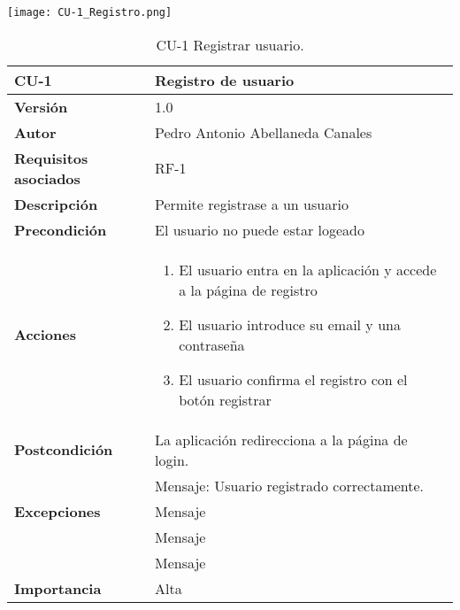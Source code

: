 \begin{table}[p]
	\centering
    \texttt{[image: CU-1\_Registro.png]}
	\begin{tabularx}{\linewidth}{ p{} p{} }
		\toprule
		\textbf{CU-1}    & \textbf{Registro de usuario}\\
		\toprule
		\textbf{Versión}              & 1.0    \\
		\textbf{Autor}                & Pedro Antonio Abellaneda Canales \\
		\textbf{Requisitos asociados} & RF-1 \\
		\textbf{Descripción}          & Permite registrase a un usuario \\
		\textbf{Precondición}         & El usuario no puede estar logeado \\
		\textbf{Acciones}             &
		\begin{enumerate}
			\def\labelenumi{\arabic{enumi}.}
			\tightlist
			\item El usuario entra en la aplicación y accede a la página de registro
			\item El usuario introduce su email y una contraseña
            \item El usuario confirma el registro con el botón registrar
		\end{enumerate}\\
		\textbf{Postcondición}        & La aplicación redirecciona a la página de login. \\ 
                                      & Mensaje: Usuario registrado correctamente. \\
		\textbf{Excepciones}          & Mensaje \\
                                      & Mensaje \\
                                      & Mensaje \\
		\textbf{Importancia}          & Alta \\
		\bottomrule
	\end{tabularx}
	\caption{CU-1 Registrar usuario.}
\end{table}


